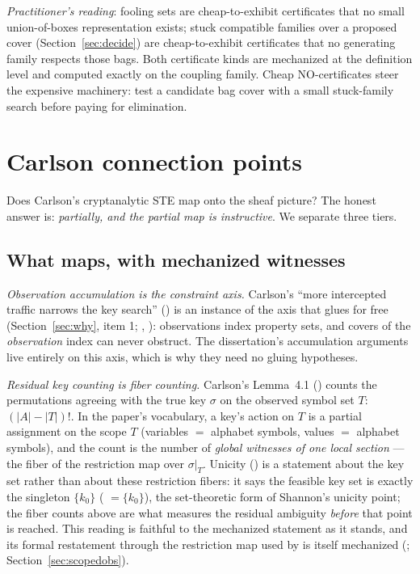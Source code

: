 \documentclass[11pt]{article}
\begin{document}
\emph{Practitioner's reading}: fooling sets are cheap-to-exhibit
certificates that no small union-of-boxes representation exists;
stuck compatible families over a proposed cover
(Section~\ref{sec:decide}) are cheap-to-exhibit certificates that no
generating family respects those bags.  Both certificate kinds are
mechanized at the definition level and computed exactly on the
coupling family.  Cheap NO-certificates steer the expensive
machinery: test a candidate bag cover with a small stuck-family
search before paying for elimination.

\section{Carlson connection points}
\label{sec:carlsonconn}

Does Carlson's cryptanalytic STE \citep{carlson2012} map onto the
sheaf picture?  The honest answer is: \emph{partially, and the
partial map is instructive}.  We separate three tiers.

\subsection{What maps, with mechanized witnesses}

\emph{Observation accumulation is the constraint axis.}  Carlson's
``more intercepted traffic narrows the key search''
() is an instance of the axis that glues
for free (Section~\ref{sec:why}, item 1;
,
): observations index property
sets, and covers of the \emph{observation} index can never obstruct.
The dissertation's accumulation arguments live entirely on this
axis, which is why they need no gluing hypotheses.

\emph{Residual key counting is fiber counting.}  Carlson's Lemma~4.1
() counts the permutations agreeing with
the true key $\sigma$ on the observed symbol set $T$: $(|A|-|T|)!$.
In the paper's vocabulary, a key's action on $T$ is a partial
assignment on the scope $T$ (variables $=$ alphabet symbols, values
$=$ alphabet symbols), and the count is the number of \emph{global
witnesses of one local section} --- the fiber of the restriction map
over $\sigma|_T$.  Unicity () is a statement about the
key set rather than about these restriction fibers: it says the
feasible key set is exactly the singleton $\{k_0\}$
( $= \{k_0\}$), the set-theoretic form
of Shannon's unicity point; the fiber counts above are what measures
the residual ambiguity \emph{before} that point is reached.  This
reading is faithful to the mechanized statement as it stands, and
its formal restatement through the restriction map used by
 is itself mechanized
(; Section~\ref{sec:scopedobs}).
\end{document}
